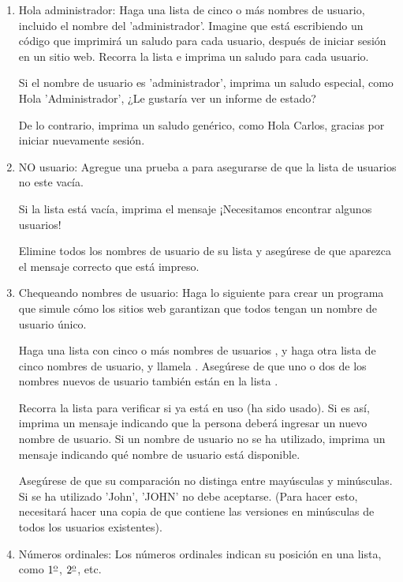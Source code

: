 \begin{enumerate}[6.5.1]
	
	\item Hola administrador: Haga una lista de cinco o más nombres de usuario, incluido el nombre del 'administrador'. Imagine que está escribiendo un código que imprimirá un saludo para cada usuario, después de iniciar sesión en un sitio web. Recorra la lista e imprima un saludo para cada usuario.
	
	Si el nombre de usuario es 'administrador', imprima un saludo especial, como Hola 'Administrador',
	¿Le gustaría ver un informe de estado?
	
	De lo contrario, imprima un saludo genérico, como Hola Carlos, gracias por iniciar nuevamente sesión.
	
	\item NO  usuario: Agregue una prueba {} a {} para asegurarse de que la lista de usuarios no este vacía.
	
	Si la lista está vacía, imprima el mensaje ¡Necesitamos encontrar algunos usuarios!
	
	Elimine todos los nombres de usuario de su lista y asegúrese de que aparezca el mensaje correcto que está impreso.
	
	
	\item Chequeando nombres de usuario: Haga lo siguiente para crear un programa que simule
	cómo los sitios web garantizan que todos tengan un nombre de usuario único.
	
	Haga una lista con cinco o más nombres de usuarios {}, y haga otra lista de cinco nombres de usuario, y llamela  {}. Asegúrese de que uno o dos de los nombres nuevos de usuario también están en la lista {}.
	
	Recorra la lista {} para verificar si ya está en uso (ha sido usado). 
	Si es así, imprima un mensaje indicando que la persona deberá ingresar un nuevo nombre de usuario. Si un nombre de usuario no se ha  utilizado, imprima un mensaje indicando qué  nombre de usuario está disponible.
	
	Asegúrese de que su comparación no distinga entre mayúsculas y minúsculas. Si se ha utilizado 'John',
	'JOHN' no debe aceptarse. (Para hacer esto, necesitará hacer una copia de  {} que 
	contiene las versiones en minúsculas de todos los usuarios existentes).
	
	\item  Números ordinales: Los números ordinales indican su posición en una lista, como $1\textsuperscript{\underline{o}}$, $2\textsuperscript{\underline{o}}$,  etc.
	

\end{enumerate}
